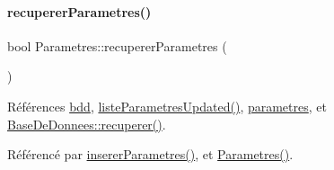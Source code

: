 \mbox{\label{class_parametres_a853872796d32655f3f1ffc090b6d076a}} 
\paragraph{\texorpdfstring{recuperer\+Parametres()}{recupererParametres()}}
{\footnotesize\ttfamily bool Parametres\+::recuperer\+Parametres (\begin{DoxyParamCaption}{ }\end{DoxyParamCaption})}



Références \hyperlink{class_parametres_a1e21034f7e758d93974e0dc070d47dee}{bdd}, \hyperlink{class_parametres_aa6649347b6e61f767dc14346f2ea858e}{liste\+Parametres\+Updated()}, \hyperlink{class_parametres_a3bff192351dd25f4109b258e954cecbf}{parametres}, et \hyperlink{class_base_de_donnees_a77539baad389f5acf754cd2cd452403e}{Base\+De\+Donnees\+::recuperer()}.



Référencé par \hyperlink{class_parametres_a0102cadfb1bce5a8e82d6c12661fccf8}{inserer\+Parametres()}, et \hyperlink{class_parametres_a5197a69e0f07e253e6119b4af95344f4}{Parametres()}.


